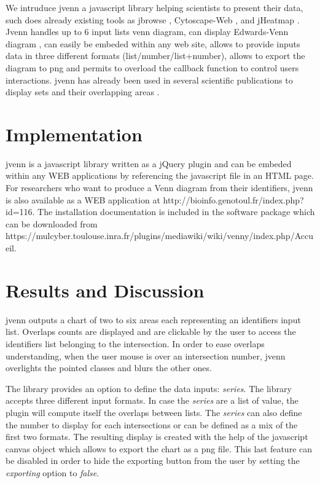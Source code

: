 \documentclass{bmcart}
\begin{document}
We intruduce jvenn a javascript library helping scientists to present their data, such does already existing 
tools as jbrowse \cite{Westesson01032013}, Cytoscape-Web \cite{Lopes2010}, and jHeatmap \cite{DeuPons2014}. 
Jvenn handles up to 6 input lists venn diagram, can display Edwards-Venn diagram \cite{Edwards2004}, can easily be 
embeded within any web site, allows to provide inputs data in three different formats (list/number/list+number), 
allows to export the diagram to png and permits to overload the callback function to control users interactions. 
jvenn has already been used in several scientific publications to display sets and their overlapping areas 
\cite{Bianchia2013, Aravindraja2013}. 


\section*{Implementation}

jvenn is a javascript library written as a jQuery plugin \cite{jquery} and can be embeded within any WEB applications 
by referencing the javascript file in an HTML page. For researchers who want to produce a Venn diagram from their 
identifiers, jvenn is also available as a WEB application at http://bioinfo.genotoul.fr/index.php?id=116. The installation
documentation is included in the software package which can be downloaded from https://mulcyber.toulouse.inra.fr/plugins/mediawiki/wiki/venny/index.php/Accueil.


\section*{Results and Discussion}

jvenn outputs a chart of two to six areas each representing an identifiers input list. Overlaps counts are displayed and 
are clickable by the user to access the identifiers list belonging to the intersection. In order to ease overlaps understanding, 
when the user mouse is over an intersection number, jvenn overlights the pointed classes and blurs the other ones.

The library provides an option to define the data inputs: \textit{series}. The library accepts three different input formats. 
In case the \textit{series} are a list of value, the plugin will compute itself the overlaps between lists. The \textit{series} 
can also define the number to display for each intersections or can be defined as a mix of the first two formats. 
The resulting display is created with the help of the javascript canvas object which allows to export the chart as a png file. 
This last feature can be disabled in order to hide the exporting button from the user by setting the \textit{exporting} option 
to \textit{false}.
\end{document}
